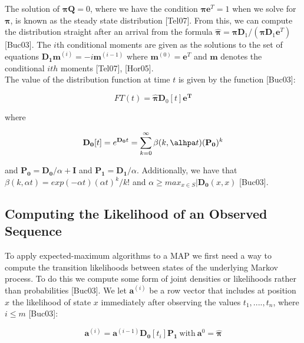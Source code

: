 \documentclass[a4paper,11pt,titlepage]{article}
\begin{document}
The solution of $\bm{\pi} \mathbf{Q} = 0$, where we have the condition $\bm{\pi}\mathbf{e}^T = 1$ when we solve for $\bm{\pi}$, is known as the steady state distribution [Tel07]. From this, we can compute the distribution straight after an arrival from the formula $\hat{\bm{\pi}} = \bm{\pi} \mathbf{ D}_{1}/(\bm{\pi} \mathbf{D}_1 \mathbf{e}{^T})$ [Buc03]. The $i$th conditional moments are given as the solutions to the set of equations $\mathbf{D_1m}^{(i)} = -i \mathbf{m}^{(i-1)}$ where $\mathbf{m}^{(0)} = \mathbf{e}^T$ and $\mathbf{m}$ denotes the conditional $ith$ moments [Tel07], [Hor05]. \\

The value of the distribution function at time $t$ is given by the function [Buc03]:

\begin{equation}
    FT(t) = \hat{\bm{\pi}} \mathbf{ D}_{0}[t] \mathbf{e^T} 
\end{equation}

where 

\begin{equation}
    \mathbf{D_0}[t] = e^{\mathbf{D_0}t} = \sum_{k=0}^{\infty}\beta(k, \alhpa t)(\mathbf{P_0})^k
\end{equation}

and $\mathbf{P_0} = \mathbf{D_0}/\alpha + \mathbf{I}$ and $\mathbf{P_1} = \mathbf{D_1}/\alpha$. Additionally, we have that $\beta(k, \alpha t) = exp(-\alpha t)(\alpha t)^k / k!$ and $\alpha \geq max_{x \in S}|\mathbf{D_0}(x,x)$ [Buc03].

\subsection{Computing the Likelihood of an Observed Sequence}

To apply expected-maximum algorithms to a MAP we first need a way to compute the transition likelihoods between states of the underlying Markov process. To do this we compute some form of joint densities or likelihoods rather than probabilities [Buc03].  We let $\mathbf{a}^{(i)}$ be a row vector that includes at position $x$ the likelihood of state $x$ immediately after observing the values $t_1,....,t_n$, where $i \leq m$ [Buc03]: 

\begin{equation}
    \mathbf{a}^{(i)} = \mathbf{a}^{(i-1)} \mathbf{D_0}[t_i]\mathbf{P_1} \: \text{with} \: \mathbf{a}^{0} = \hat{\bm{\pi}}
    \label{a_likelihood_eqn}
\end{equation}
\end{document}
